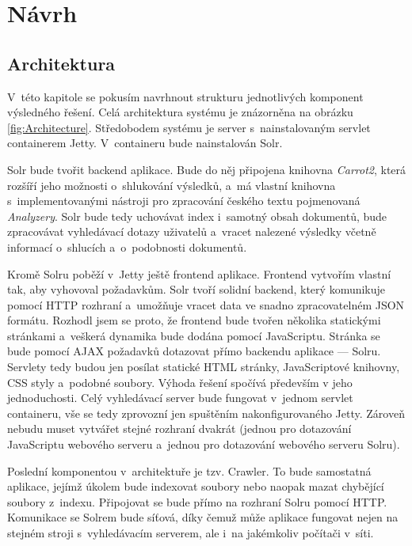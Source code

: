 \chapter{Návrh}
\section{Architektura} \label{arch}
V~této kapitole se pokusím navrhnout strukturu jednotlivých komponent výsledného řešení. Celá architektura systému je znázorněna na obrázku \ref{fig:Architecture}. Středobodem systému je server s~nainstalovaným servlet containerem Jetty. V~containeru bude nainstalován Solr. 

Solr bude tvořit backend aplikace. Bude do něj připojena knihovna \emph{Carrot2}, která rozšíří jeho možnosti o~shlukování výsledků, a~má vlastní knihovna s~implementovanými nástroji pro zpracování českého textu pojmenovaná \emph{Analyzery}. Solr bude tedy uchovávat index i~samotný obsah dokumentů, bude zpracovávat vyhledávací dotazy uživatelů a~vracet nalezené výsledky včetně informací o~shlucích a~o~podobnosti dokumentů.

Kromě Solru poběží v~Jetty ještě frontend aplikace. Frontend vytvořím vlastní tak, aby vyhovoval požadavkům. Solr tvoří solidní backend, který komunikuje pomocí HTTP rozhraní a~umožňuje vracet data ve snadno zpracovatelném JSON formátu. Rozhodl jsem se proto, že frontend bude tvořen několika statickými stránkami a~veškerá dynamika bude dodána pomocí JavaScriptu. Stránka se bude pomocí AJAX požadavků dotazovat přímo backendu aplikace --- Solru. Servlety tedy budou jen posílat statické HTML stránky, JavaScriptové knihovny, CSS styly a~podobné soubory. Výhoda řešení spočívá především v jeho jednoduchosti. Celý vyhledávací server bude fungovat v~jednom servlet containeru, vše se tedy zprovozní jen spuštěním nakonfigurovaného Jetty. Zároveň nebudu muset vytvářet stejné rozhraní dvakrát (jednou pro dotazování JavaScriptu webového serveru a~jednou pro dotazování webového serveru Solru).

Poslední komponentou v~architektuře je tzv. Crawler. To bude samostatná aplikace, jejímž úkolem bude indexovat soubory nebo naopak mazat chybějící soubory z~indexu. Připojovat se bude přímo na rozhraní Solru pomocí HTTP. Komunikace se Solrem bude síťová, díky čemuž může aplikace fungovat nejen na stejném stroji s~vyhledávacím serverem, ale i~na jakémkoliv počítači v~síti.

